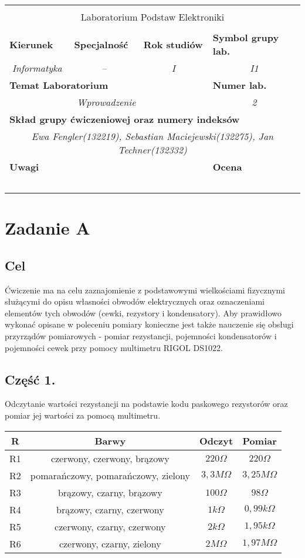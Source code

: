 \documentclass[polish,a4paper]{article}
\newcommand{\PRzFieldDsc}[1]{\sffamily\bfseries\scriptsize #1}
\newcommand{\PRzFieldCnt}[1]{\itshape #1}
\newcommand{\PRzHeading}[8]{

\begin{center}
\begin{tabular}{ p{0.32\textwidth} p{0.15\textwidth} p{0.15\textwidth} p{0.12\textwidth} p{0.12\textwidth} }

  &   &   &   &   \\
\hline
\multicolumn{5}{|c|}{}\\[-1ex]
\multicolumn{5}{|c|}{{\LARGE #1}}\\
\multicolumn{5}{|c|}{}\\[-1ex]

\hline
\multicolumn{1}{|l|}{\PRzFieldDsc{Kierunek}}	& \multicolumn{1}{|l|}{\PRzFieldDsc{Specjalność}}	& \multicolumn{1}{|l|}{\PRzFieldDsc{Rok studiów}}	& \multicolumn{2}{|l|}{\PRzFieldDsc{Symbol grupy lab.}} \\
\multicolumn{1}{|c|}{\PRzFieldCnt{#2}}		& \multicolumn{1}{|c|}{\PRzFieldCnt{#3}}		& \multicolumn{1}{|c|}{\PRzFieldCnt{#4}}		& \multicolumn{2}{|c|}{\PRzFieldCnt{#5}} \\

\hline
\multicolumn{4}{|l|}{\PRzFieldDsc{Temat Laboratorium}}		& \multicolumn{1}{|l|}{\PRzFieldDsc{Numer lab.}} \\
\multicolumn{4}{|c|}{\PRzFieldCnt{#6}}				& \multicolumn{1}{|c|}{\PRzFieldCnt{#7}} \\

\hline
\multicolumn{5}{|l|}{\PRzFieldDsc{Skład grupy ćwiczeniowej oraz numery indeksów}}\\
\multicolumn{5}{|c|}{\PRzFieldCnt{#8}}\\

\hline
\multicolumn{3}{|l|}{\PRzFieldDsc{Uwagi}}	& \multicolumn{2}{|l|}{\PRzFieldDsc{Ocena}} \\
\multicolumn{3}{|c|}{\PRzFieldCnt{\ }}		& \multicolumn{2}{|c|}{\PRzFieldCnt{\ }} \\

\hline
\end{tabular}
\end{center}
}
\begin{document}
\PRzHeading{Laboratorium Podstaw Elektroniki}{Informatyka}{--}{I}{I1}{Wprowadzenie}{2}{Ewa Fengler(132219), Sebastian Maciejewski(132275), Jan Techner(132332)}{}


\section{Zadanie A}

\subsection*{Cel}


Ćwiczenie ma na celu zaznajomienie z podstawowymi wielkościami fizycznymi służącymi do opisu własności obwodów elektrycznych oraz oznaczeniami elementów tych obwodów (cewki, rezystory i kondensatory). Aby prawidłowo wykonać opisane w poleceniu pomiary konieczne jest także nauczenie się obsługi przyrządów pomiarowych - pomiar rezystancji, pojemności kondensatorów i pojemności cewek przy pomocy multimetru RIGOL DS1022.

\subsection{Część 1.}
Odczytanie wartości rezystancji na podstawie kodu paskowego rezystorów oraz pomiar jej wartości za pomocą multimetru.\\

\begin{center}
\begin{tabular}{|c|c|c|c|}
\hline
\textbf{R} & \textbf{Barwy} & \textbf{Odczyt} & \textbf{Pomiar}\\
\hline
R1 & czerwony, czerwony, brązowy & $220\Omega$ & $220\Omega$\\
\hline
R2 & pomarańczowy, pomarańczowy, zielony & $3,3M\Omega$ & $3,25M\Omega$\\
\hline
R3 & brązowy, czarny, brązowy & $100\Omega$ & $98\Omega$\\
\hline
R4 & brązowy, czarny, czerwony & $1k\Omega$ & $0,99k\Omega$\\
\hline
R5 & czerwony, czarny, czerwony & $2k\Omega$ & $1,95k\Omega$\\
\hline
R6 & czerwony, czarny, zielony & $2M\Omega$ & $1,97M\Omega$\\
\hline
\end{tabular}
\end{center}
\end{document}
